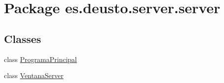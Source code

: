 \hypertarget{namespacees_1_1deusto_1_1server_1_1server}{}\section{Package es.\+deusto.\+server.\+server}
\label{namespacees_1_1deusto_1_1server_1_1server}
\subsection*{Classes}
\begin{DoxyCompactItemize}
\item 
class \mbox{\hyperlink{classes_1_1deusto_1_1server_1_1server_1_1_programa_principal}{Programa\+Principal}}
\item 
class \mbox{\hyperlink{classes_1_1deusto_1_1server_1_1server_1_1_ventana_server}{Ventana\+Server}}
\end{DoxyCompactItemize}
